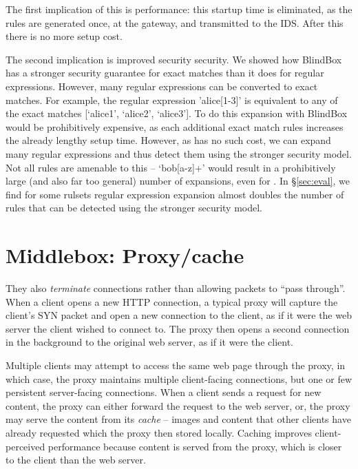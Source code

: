 The first implication of this is performance: this startup time is eliminated, as the rules are generated once, at the gateway, and transmitted to the IDS. After this there is no more setup cost.

The second implication is improved security security. We showed how BlindBox has a stronger security guarantee for exact matches than it does for regular expressions. However, many regular expressions can be converted to exact matches. 
For example, the regular expression 'alice[1-3]' is equivalent to any of the exact matches [`alice1', `alice2', `alice3'].
To do this expansion with BlindBox would be prohibitively expensive, as each additional exact match rules increases the already lengthy setup time.
However, as \sys has no such cost, we can expand many regular expressions and thus detect them using the stronger security model.
Not all rules are amenable to this -- \eg{} `bob[a-z]+' would result in a prohibitively large (and also far too general) number of expansions, even for \sys. 
In \S\ref{sec:eval}, we find for some rulsets regular expression expansion almost doubles the number of rules that can be detected using the stronger security model.


\section{Middlebox: Proxy/cache}\label{s:proxy}
They also {\it terminate} connections rather than allowing packets to ``pass through''.
When a client opens a new HTTP connection, a typical proxy will capture the client's SYN packet and open a new connection to the client, as if it were the web server the client wished to connect to. 
The proxy then opens a second connection in the background to the original web server, as if it were the client. 

Multiple clients may attempt to access the same web page through the proxy, in which case, the proxy maintains multiple client-facing connections, but one or few persistent server-facing connections.
When a client sends a request for new content, the proxy can either forward the request to the web server, or, the proxy may serve the content from its {\it cache} -- images and content that other clients have already requested which the proxy then stored locally. 
Caching improves client-perceived performance because content is served from the proxy, which is closer to the client than the web server.

